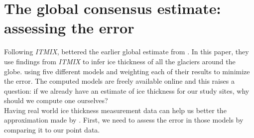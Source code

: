 \documentclass[a4, 12pt]{article}
\begin{document}
\section{The global consensus estimate: assessing the error}
Following \textit{ITMIX}, \citeauthor{farinotti2019consensus} bettered the earlier global estimate from \citeauthor{huss2012distributed} \citeyear{huss2012distributed}. In this paper, they use findings from \textit{ITMIX} to infer ice thickness of all the glaciers around the globe. using five different models and weighting each of their results to minimize the error. The computed models are freely available online and this raises a question: if we already have an estimate of ice thickness for our study sites, why should we compute one ourselves?\\ Having real world ice thickness measurement data can help us better the approximation made by \citeauthor{farinotti2019consensus} \citeyear{farinotti2019consensus}. First, we need to assess the error in those models by comparing it to our point data.
\end{document}
